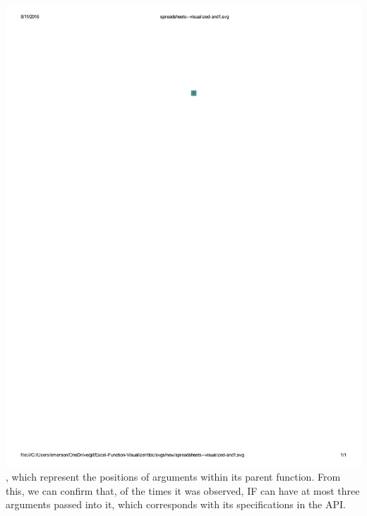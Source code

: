 \documentclass[conference]{IEEEtran}
\begin{document}
	\includegraphics{glossary-blue}, which represent the positions of arguments
	within its parent function. From this, we can confirm that, of the times it was
	observed, IF can have at most three arguments passed into it, which corresponds
	with its specifications in the API. \par
	
\end{document}
